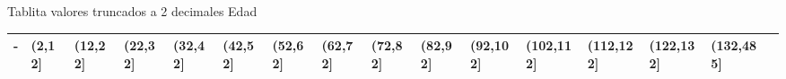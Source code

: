 \documentclass[8pt]{article}
\begin{document}
Tablita valores truncados a 2 decimales Edad



  \begin{table}
    \begin{adjustbox}{width=1\textwidth}
      \small
      \begin{tabularx} {1\textwidth}{ 
          | >{\raggedright\arraybackslash}X 
          | >{\raggedleft\arraybackslash}X 
          | >{\raggedleft\arraybackslash}X 
          | >{\raggedleft\arraybackslash}X 
          | >{\raggedleft\arraybackslash}X 
          | >{\raggedleft\arraybackslash}X
          | >{\raggedleft\arraybackslash}X
          | >{\raggedleft\arraybackslash}X
          | >{\raggedleft\arraybackslash}X
          | >{\raggedleft\arraybackslash}X
          | >{\raggedleft\arraybackslash}X
          | >{\raggedleft\arraybackslash}X
          | >{\raggedleft\arraybackslash}X
          | >{\raggedleft\arraybackslash}X
          | >{\raggedleft\arraybackslash}X 
          | >{\raggedleft\arraybackslash}X |}
          \resizebox{\textwidth}{!}
        \hline
        - & (2,12] & (12,22] & (22,32] & (32,42] & (42,52] & (52,62] & (62,72] & (72,82] & (82,92] & (92,102] & (102,112] & (112,122] & (122,132] & (132,485] \\
        \hline
        \end{tabularx}
    \end{adjustbox}
  \end{table}
\end{document}

